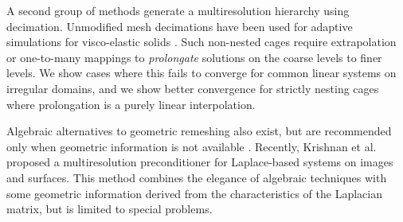 %

A second group of methods generate a multiresolution hierarchy using decimation. Unmodified mesh decimations \cite{Garland:1997:SSU} have been used for adaptive
simulations for visco-elastic solids \cite{Debunne:2001:DRD}.
%
Such non-nested cages require extrapolation or one-to-many mappings to
\emph{prolongate} solutions on the coarse levels to finer levels.
%
We show cases where this fails to converge for common linear systems on
irregular domains, and we show better convergence for strictly nesting cages where
prolongation is a purely linear interpolation.

Algebraic alternatives to geometric remeshing also exist,
but are recommended only when geometric information is not available
\cite{falgout06}.
%
Recently, Krishnan et al.  proposed a
multiresolution preconditioner for Laplace-based systems on images and
surfaces.
%
This method combines the elegance of algebraic techniques with some geometric
information derived from the characteristics of the Laplacian matrix, but is
limited to special problems.

